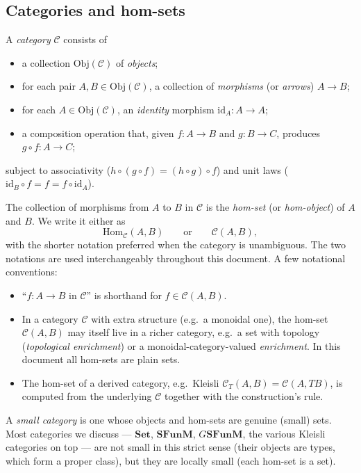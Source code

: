 \documentclass[11pt]{article}
\newcommand{\Set}{\mathbf{Set}}
\newcommand{\SFunM}{\mathbf{SFunM}}
\newcommand{\id}{\mathrm{id}}
\newcommand{\Hom}{\mathrm{Hom}}
\newcommand{\Obj}{\mathrm{Obj}}
\begin{document}
\subsection{Categories and hom-sets}
\label{sec:hom-sets}

A \emph{category} $\mathcal{C}$ consists of
\begin{itemize}
  \item a collection $\Obj(\mathcal{C})$ of \emph{objects};
  \item for each pair $A, B \in \Obj(\mathcal{C})$, a collection of
        \emph{morphisms} (or \emph{arrows}) $A \to B$;
  \item for each $A \in \Obj(\mathcal{C})$, an \emph{identity}
        morphism $\id_A : A \to A$;
  \item a composition operation that, given $f : A \to B$ and
        $g : B \to C$, produces $g \circ f : A \to C$;
\end{itemize}
subject to associativity ($h \circ (g \circ f) = (h \circ g) \circ f$)
and unit laws ($\id_B \circ f = f = f \circ \id_A$).

The collection of morphisms from $A$ to $B$ in $\mathcal{C}$ is the
\emph{hom-set} (or \emph{hom-object}) of $A$ and $B$.  We write it
either as
\[
  \Hom_\mathcal{C}(A, B) \qquad\text{or}\qquad \mathcal{C}(A, B),
\]
with the shorter notation preferred when the category is unambiguous.
The two notations are used interchangeably throughout this document.
A few notational conventions:
\begin{itemize}
  \item ``$f : A \to B$ in $\mathcal{C}$'' is shorthand for
        $f \in \mathcal{C}(A, B)$.
  \item In a category $\mathcal{C}$ with extra structure (e.g.\ a
        monoidal one), the hom-set $\mathcal{C}(A, B)$ may itself
        live in a richer category, e.g.\ a set with topology
        (\emph{topological enrichment}) or a monoidal-category-valued
        \emph{enrichment}.  In this document all hom-sets are plain
        sets.
  \item The hom-set of a derived category, e.g.\ Kleisli
        $\mathcal{C}_T(A, B) = \mathcal{C}(A, T B)$, is computed from
        the underlying $\mathcal{C}$ together with the construction's
        rule.
\end{itemize}

A \emph{small category} is one whose objects and hom-sets are
genuine (small) sets.  Most categories we discuss --- $\Set$,
$\SFunM$, $G\SFunM$, the various Kleisli categories on top --- are
not small in this strict sense (their objects are types, which form
a proper class), but they are locally small (each hom-set is a set).
\end{document}
